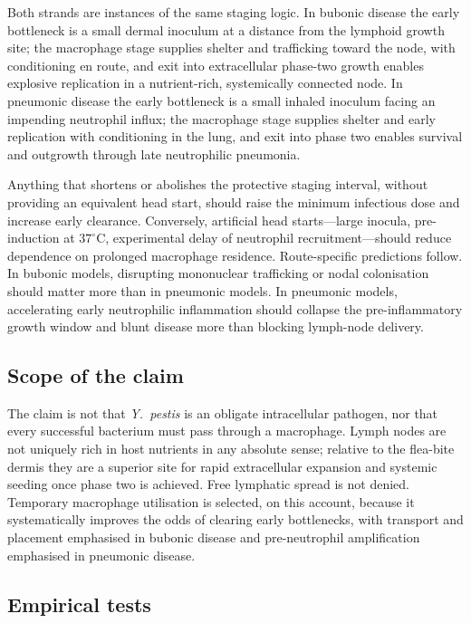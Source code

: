 \documentclass[11pt,a4paper]{article}
\begin{document}
Both strands are instances of the same staging logic. In bubonic disease the early bottleneck is a small dermal inoculum at a distance from the lymphoid growth site; the macrophage stage supplies shelter and trafficking toward the node, with conditioning en route, and exit into extracellular phase-two growth enables explosive replication in a nutrient-rich, systemically connected node. In pneumonic disease the early bottleneck is a small inhaled inoculum facing an impending neutrophil influx; the macrophage stage supplies shelter and early replication with conditioning in the lung, and exit into phase two enables survival and outgrowth through late neutrophilic pneumonia.

Anything that shortens or abolishes the protective staging interval, without providing an equivalent head start, should raise the minimum infectious dose and increase early clearance. Conversely, artificial head starts---large inocula, pre-induction at $37^\circ\mathrm{C}$, experimental delay of neutrophil recruitment---should reduce dependence on prolonged macrophage residence. Route-specific predictions follow. In bubonic models, disrupting mononuclear trafficking or nodal colonisation should matter more than in pneumonic models. In pneumonic models, accelerating early neutrophilic inflammation should collapse the pre-inflammatory growth window and blunt disease more than blocking lymph-node delivery.

\subsection{Scope of the claim}

The claim is not that \textit{Y.\ pestis} is an obligate intracellular pathogen, nor that every successful bacterium must pass through a macrophage. Lymph nodes are not uniquely rich in host nutrients in any absolute sense; relative to the flea-bite dermis they are a superior site for rapid extracellular expansion and systemic seeding once phase two is achieved. Free lymphatic spread is not denied. Temporary macrophage utilisation is selected, on this account, because it systematically improves the odds of clearing early bottlenecks, with transport and placement emphasised in bubonic disease and pre-neutrophil amplification emphasised in pneumonic disease.

\subsection{Empirical tests}
\end{document}
